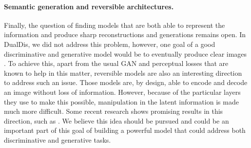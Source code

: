 \paragraph{Semantic generation and reversible architectures.}
Finally, the question of finding models that are both able to represent the information and produce sharp reconstructions and generations remains open. In DualDis, we did not address this problem, however, one goal of a good discriminative and generative model would be to eventually produce clear images \citep[\eg\unskip][]{karras2018style}. To achieve this, apart from the usual \acs{GAN} and perceptual losses that are known to help in this matter, reversible models \citep{NIPS2017_6816,jacobsen:hal-01712808} are also an interesting direction to address such an issue. Those models are, by design, able to encode and decode an image without loss of information. However, because of the particular layers they use to make this possible, manipulation in the latent information is made much more difficult. Some recent research shows promising results in this direction, such as \citet{kingma2018glow,lucas2019adversarial}. We believe this idea should be pursued and could be an important part of this goal of building a powerful model that could address both discriminative and generative tasks.
